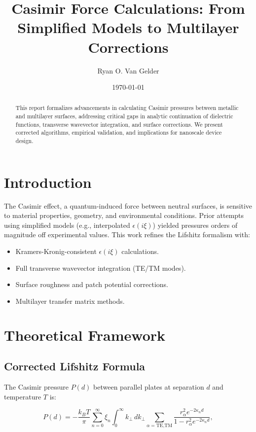 \documentclass{article}
\title{Casimir Force Calculations: From Simplified Models to Multilayer Corrections}
\author{Ryan O. Van Gelder}
\date{\today}
\begin{document}
\maketitle

\begin{abstract}
This report formalizes advancements in calculating Casimir pressures between metallic and multilayer surfaces, addressing critical gaps in analytic continuation of dielectric functions, transverse wavevector integration, and surface corrections. We present corrected algorithms, empirical validation, and implications for nanoscale device design.
\end{abstract}

\section{Introduction}
The Casimir effect, a quantum-induced force between neutral surfaces, is sensitive to material properties, geometry, and environmental conditions. Prior attempts using simplified models (e.g., interpolated \(\epsilon(i\xi)\)) yielded pressures orders of magnitude off experimental values. This work refines the Lifshitz formalism with:

\begin{itemize}
    \item Kramers-Kronig-consistent \(\epsilon(i\xi)\) calculations.
    \item Full transverse wavevector integration (TE/TM modes).
    \item Surface roughness and patch potential corrections.
    \item Multilayer transfer matrix methods.
\end{itemize}

\section{Theoretical Framework}
\subsection{Corrected Lifshitz Formula}
The Casimir pressure \(P(d)\) between parallel plates at separation \(d\) and temperature \(T\) is:

\begin{equation}
P(d) = -\frac{k_B T}{\pi} \sum_{n=0}^{\infty} \xi_n \int_0^\infty k_{\perp} \, dk_{\perp} \sum_{\alpha=\text{TE,TM}} \frac{r_\alpha^2 e^{-2\kappa_n d}}{1 - r_\alpha^2 e^{-2\kappa_n d}},
\end{equation}
\end{document}
